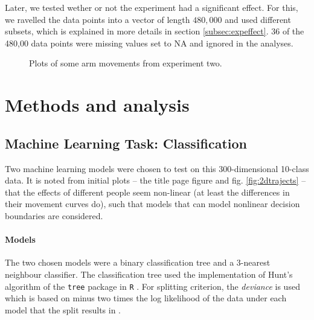 \documentclass[11pt,fleqn]{article}
\begin{document}
Later, we tested wether or not the experiment had a significant effect.
For this, we ravelled the data points into a vector of length $ 480,000 $ and used different subsets, which is explained in more details in section \ref{subsec:expeffect}. 36 of the 480,00 data points were missing values set to NA and ignored in the analyses.

\begin{figure}[H]
	\centering
	\hfill
	\caption{Plots of some arm movements from experiment two.}
\end{figure}

\section{Methods and analysis}


\subsection{Machine Learning Task: Classification}
Two machine learning models were chosen to test on this 300-dimensional 10-class data.
It is noted from initial plots -- the title page figure and fig. \ref{fig:2dtrajects} -- that the effects of different people seem non-linear (at least the differences in their movement curves do), such that models that can model nonlinear decision boundaries are considered.
\paragraph{Models} The two chosen models were a binary classification tree and a 3-nearest neighbour classifier. The classification tree used the implementation of Hunt's algorithm of the \texttt{tree} package in \texttt{R} \cite{Tree}. For splitting criterion, the \textit{deviance} is used which is based on minus two times the log likelihood of the data under each model that the split results in \cite{Deviance}.
\end{document}
